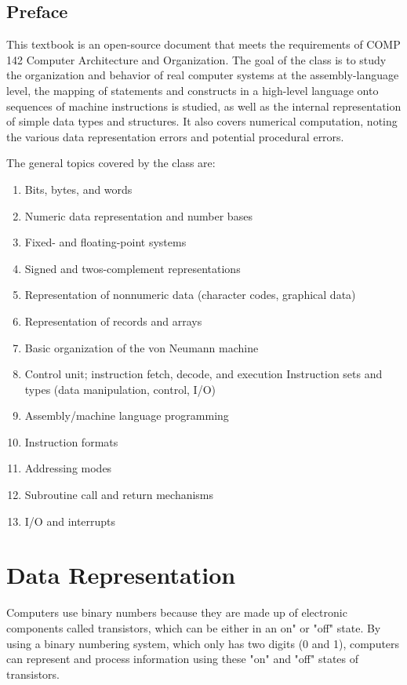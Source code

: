 \documentclass[11pt]{book}
\begin{document}
\section{Preface\label{sec:preface}}

This textbook is an open-source document that meets the requirements of COMP 142 Computer Architecture and Organization. The goal of the class is to study the organization and behavior of real computer systems at the assembly-language level, the mapping of statements and constructs in a high-level language onto sequences of machine instructions is studied, as well as the internal representation of simple data types and structures. It also covers numerical computation, noting the various data representation errors and potential procedural errors.

The general topics covered by the class are:

\begin{enumerate}
\item Bits, bytes, and words
\item Numeric data representation and number bases
\item Fixed- and floating-point systems
\item Signed and twos-complement representations
\item Representation of nonnumeric data (character codes, graphical data)
\item Representation of records and arrays
\item Basic organization of the von Neumann machine
\item Control unit; instruction fetch, decode, and execution
    Instruction sets and types (data manipulation, control, I/O)
\item Assembly/machine language programming
\item Instruction formats
\item Addressing modes
\item Subroutine call and return mechanisms
\item I/O and interrupts
\end{enumerate}

\chapter{Data Representation\label{sec:data}}

Computers use binary numbers because they are made up of electronic components called transistors, which can be either in an  on" or "off" state. By using a binary numbering system, which only has two digits (0 and 1), computers can represent and process information using these "on" and "off" states of transistors.
\end{document}
